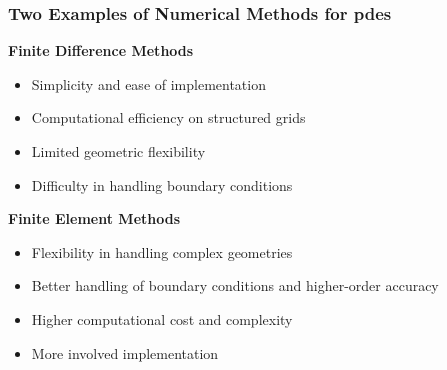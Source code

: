\begin{frame}
    \frametitle{Two Examples of Numerical Methods for \acrshort{pdes}}

    \vspace*{\fill}
    \begin{multicols}{2}

        \begin{center}
            {\color{\accentcolor} \Large \textbf{Finite Difference Methods}}
            \vspace*{0.5cm}

            \begin{minipage}{0.4\textwidth}
                \begin{itemize}
                    \color{\procolor}
                    \item Simplicity and ease of implementation
                    \item Computational efficiency on structured grids
                \end{itemize}
    
                \begin{itemize}
                    \color{\concolor}
                    \item Limited geometric flexibility
                    \item Difficulty in handling boundary conditions
                \end{itemize}
            \end{minipage}
        \end{center}

        \vfill\null
        \columnbreak

        \begin{center}
            {\color{\accentcolor} \Large \textbf{Finite Element Methods}}
            \vspace*{0.5cm}

            \begin{minipage}{0.4\textwidth}
                \begin{itemize}
                    \color{\procolor}
                    \item Flexibility in handling complex geometries
                    \item Better handling of boundary conditions and higher-order accuracy
                \end{itemize}

                \begin{itemize}
                    \color{\concolor}
                    \item Higher computational cost and complexity
                    \item More involved implementation
                \end{itemize}
            \end{minipage}
        \end{center}
    \end{multicols}
    \vspace*{\fill}
    
\end{frame}


    
